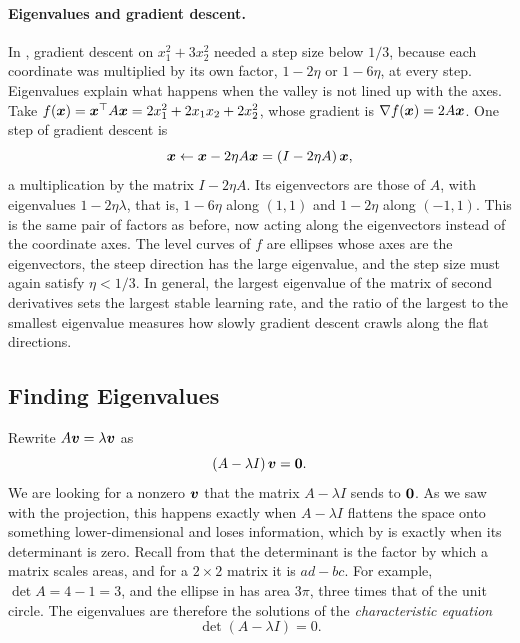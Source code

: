 \paragraph{Eigenvalues and gradient descent.}
In , gradient descent on $x_1^2 + 3x_2^2$ needed
a step size below $1/3$, because each coordinate was multiplied by its
own factor, $1 - 2\eta$ or $1 - 6\eta$, at every step. Eigenvalues explain
what happens when the valley is not lined up with the axes. Take
$f(\bm{x}) = \bm{x}^\top A \bm{x} = 2x_1^2 + 2x_1 x_2 + 2x_2^2$, whose
gradient is $\nabla f(\bm{x}) = 2A\bm{x}$. One step of gradient
descent is
\[
  \bm{x} \leftarrow \bm{x} - 2\eta A\bm{x} = (I - 2\eta A)\,\bm{x} ,
\]
a multiplication by the matrix $I - 2\eta A$. Its eigenvectors are those
of $A$, with eigenvalues $1 - 2\eta\lambda$, that is, $1 - 6\eta$ along
$(1, 1)$ and $1 - 2\eta$ along $(-1, 1)$. This is the same pair of factors
as before, now acting along the eigenvectors instead of the coordinate
axes. The level curves of $f$ are ellipses whose axes are the
eigenvectors, the steep direction has the large eigenvalue, and the step
size must again satisfy $\eta < 1/3$. In general, the largest eigenvalue
of the matrix of second derivatives sets the largest stable learning
rate, and the ratio of the largest to the smallest eigenvalue measures
how slowly gradient descent crawls along the flat directions.

\subsection{Finding Eigenvalues}
\label{sec:ch04-eigen-compute}

Rewrite $A\bm{v} = \lambda\bm{v}$ as
\[
  (A - \lambda I)\,\bm{v} = \bm{0} .
\]
We are looking for a nonzero $\bm{v}$ that the matrix $A - \lambda I$
sends to $\bm{0}$. As we saw with the projection, this happens exactly
when $A - \lambda I$ flattens the space onto something lower-dimensional
and loses information, which by  is exactly
when its determinant is zero. Recall from  that the
determinant is the factor by which a matrix scales areas, and for a
$2 \times 2$ matrix it is $ad - bc$. For example, $\det A = 4 - 1 = 3$,
and the ellipse in  has area $3\pi$, three times
that of the unit circle. The eigenvalues are therefore the solutions of
the \emph{characteristic equation}
\[
  \det(A - \lambda I) = 0 .
\]

